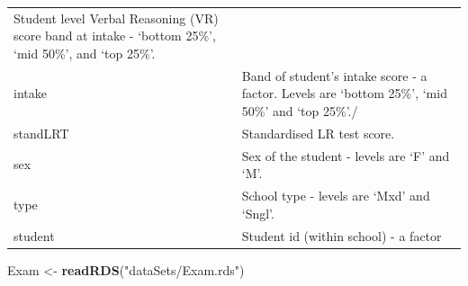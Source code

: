 \documentclass[]{book}
\newenvironment{Shaded}{\begin{snugshade}}{\end{snugshade}}
\newcommand{\KeywordTok}[1]{\textcolor[rgb]{0.13,0.29,0.53}{\textbf{#1}}}
\newcommand{\StringTok}[1]{\textcolor[rgb]{0.31,0.60,0.02}{#1}}
\newcommand{\NormalTok}[1]{#1}
\begin{document}
\begin{longtable}[]{@{}ll@{}}
\begin{minipage}[t]{0.85\columnwidth}
Student level Verbal Reasoning (VR) score band at intake - `bottom
25\%', `mid 50\%', and `top 25\%'.\strut
\end{minipage}\tabularnewline
\begin{minipage}[t]{0.09\columnwidth}\raggedright\strut
intake\strut
\end{minipage} & \begin{minipage}[t]{0.85\columnwidth}\raggedright\strut
Band of student's intake score - a factor. Levels are `bottom 25\%',
`mid 50\%' and `top 25\%'./\strut
\end{minipage}\tabularnewline
\begin{minipage}[t]{0.09\columnwidth}\raggedright\strut
standLRT\strut
\end{minipage} & \begin{minipage}[t]{0.85\columnwidth}\raggedright\strut
Standardised LR test score.\strut
\end{minipage}\tabularnewline
\begin{minipage}[t]{0.09\columnwidth}\raggedright\strut
sex\strut
\end{minipage} & \begin{minipage}[t]{0.85\columnwidth}\raggedright\strut
Sex of the student - levels are `F' and `M'.\strut
\end{minipage}\tabularnewline
\begin{minipage}[t]{0.09\columnwidth}\raggedright\strut
type\strut
\end{minipage} & \begin{minipage}[t]{0.85\columnwidth}\raggedright\strut
School type - levels are `Mxd' and `Sngl'.\strut
\end{minipage}\tabularnewline
\begin{minipage}[t]{0.09\columnwidth}\raggedright\strut
student\strut
\end{minipage} & \begin{minipage}[t]{0.85\columnwidth}\raggedright\strut
Student id (within school) - a factor\strut
\end{minipage}\tabularnewline
\bottomrule
\end{longtable}

\begin{Shaded}
\begin{Highlighting}[]
\NormalTok{  Exam <-}\StringTok{ }\KeywordTok{readRDS}\NormalTok{(}\StringTok{"dataSets/Exam.rds"}\NormalTok{)}
\end{Highlighting}
\end{Shaded}
\end{document}
